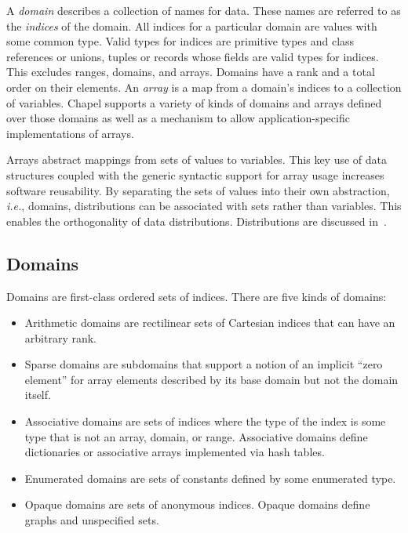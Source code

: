 \label{Domains_and_Arrays}

A \emph{domain} describes a collection of names for data.  These names
are referred to as the \emph{indices} of the domain.  All indices for
a particular domain are values with some common type.  Valid types for
indices are primitive types and class references or unions, tuples or
records whose fields are valid types for indices.  This excludes
ranges, domains, and arrays.  Domains have a rank and a total order on
their elements.  An \emph{array} is a map from a domain's indices to a
collection of variables.  Chapel supports a variety of kinds of
domains and arrays defined over those domains as well as a mechanism
to allow application-specific implementations of arrays.

Arrays abstract mappings from sets of values to variables.  This key
use of data structures coupled with the generic syntactic support for
array usage increases software reusability.  By separating the sets of
values into their own abstraction, \emph{i.e.}, domains, distributions
can be associated with sets rather than variables.  This enables the
orthogonality of data distributions.  Distributions are discussed
in~.

\subsection{Domains}
\label{Domains}

Domains are first-class ordered sets of indices.  There are five kinds
of domains:
\begin{itemize}
\item
Arithmetic domains are rectilinear sets of Cartesian indices that can
have an arbitrary rank.
\item
Sparse domains are subdomains that support a notion of an implicit
``zero element'' for array elements described by its base domain but
not the domain itself.
\item
Associative domains are sets of indices where the type of the index is
some type that is not an array, domain, or range.  Associative domains
define dictionaries or associative arrays implemented via hash tables.
\item
Enumerated domains are sets of constants defined by some enumerated
type.
\item
Opaque domains are sets of anonymous indices.  Opaque domains define
graphs and unspecified sets.
\end{itemize}

